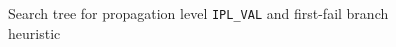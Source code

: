 \documentclass[a4paper, 11pt]{article}
\begin{document}
\begin{figure}[H]
  \begin{center}
    \caption{Search tree for propagation level \texttt{IPL\_VAL} and first-fail branch heuristic}
    \label{fig:val1_ff}
  \end{center}
\end{figure}
\end{document}
